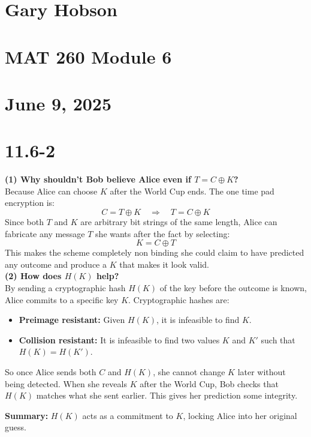\documentclass[12pt]{article}
\begin{document}
\section*{Gary Hobson}
\section*{MAT 260 Module 6}
\section*{June 9, 2025} 
\newpage
\section{11.6-2}
\textbf{(1) Why shouldn't Bob believe Alice even if \( T = C \oplus K \)?} \\
Because Alice can choose \( K \) after the World Cup ends. The one time pad encryption is:
\[
C = T \oplus K \quad \Rightarrow \quad T = C \oplus K
\]
Since both \( T \) and \( K \) are arbitrary bit strings of the same length, Alice can fabricate any message \( T \) she wants after the fact by selecting:
\[
K = C \oplus T
\]
This makes the scheme completely non binding she could claim to have predicted any outcome and produce a \( K \) that makes it look valid.\\

\textbf{(2) How does \( H(K) \) help?} \\
By sending a cryptographic hash \( H(K) \) of the key before the outcome is known, Alice commits to a specific key \( K \). Cryptographic hashes are:
\begin{itemize}
    \item \textbf{Preimage resistant:} Given \( H(K) \), it is infeasible to find \( K \).
    \item \textbf{Collision resistant:} It is infeasible to find two values \( K \) and \( K' \) such that \( H(K) = H(K') \).
\end{itemize}
So once Alice sends both \( C \) and \( H(K) \), she cannot change \( K \) later without being detected. When she reveals \( K \) after the World Cup, Bob checks that \( H(K) \) matches what she sent earlier. This gives her prediction some integrity.

\textbf{Summary:} \( H(K) \) acts as a commitment to \( K \), locking Alice into her original guess.\\
\end{document}
